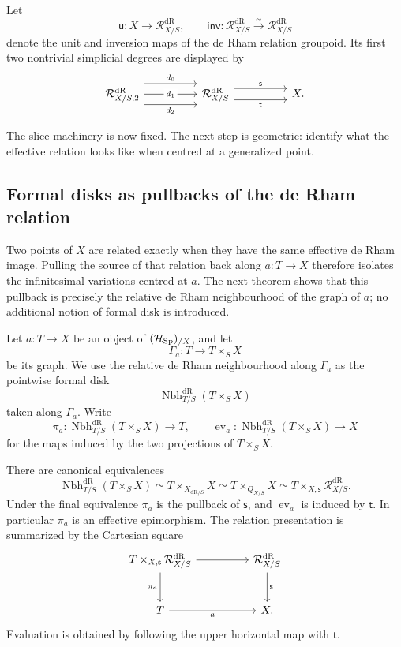 Let
\[
  \mathsf u:X\to\mathcal R^{\mathrm{dR}}_{X/S},
  \qquad
  \mathsf{inv}:
  \mathcal R^{\mathrm{dR}}_{X/S}
  \xrightarrow{\simeq}
  \mathcal R^{\mathrm{dR}}_{X/S}
\]
denote the unit and inversion maps of the de Rham relation groupoid. Its
first two nontrivial simplicial degrees are displayed by
\[
\begin{tikzcd}[column sep=huge]
\mathcal R^{\mathrm{dR}}_{X/S,2}
  \ar[r,shift left=2.2ex,"d_0"]
  \ar[r,"d_1" description]
  \ar[r,shift right=2.2ex,"d_2"']
&
\mathcal R^{\mathrm{dR}}_{X/S}
  \ar[r,shift left=1.2ex,"\mathsf s"]
  \ar[r,shift right=1.2ex,"\mathsf t"']
&
X .
\end{tikzcd}
\]

The slice machinery is now fixed. The next step is geometric: identify what the
effective relation looks like when centred at a generalized point.

\subsection{Formal disks as pullbacks of the de Rham relation}
\label{sec:formal-disks}

Two points of \(X\) are related exactly when they have the same effective de
Rham image. Pulling the source of that relation back along
\(a:T\to X\) therefore isolates the infinitesimal variations centred at
\(a\). The next theorem shows that this pullback is precisely the relative de
Rham neighbourhood of the graph of \(a\); no additional notion of formal disk
is introduced.

Let \(a:T\to X\) be an object of \((\mathcal H_{\operatorname{Sp}})_{/X}\), and let
\[
  \Gamma_a:T\longrightarrow T\times_SX
\]
be its graph. We use the relative de Rham neighbourhood along \(\Gamma_a\) as
the pointwise formal disk
\[
  \operatorname{Nbh}^{\mathrm{dR}}_{T/S}(T\times_SX)
\]
taken along \(\Gamma_a\). Write
\[
  \pi_a:
  \operatorname{Nbh}^{\mathrm{dR}}_{T/S}(T\times_SX)\to T,
  \qquad
  \operatorname{ev}_a:
  \operatorname{Nbh}^{\mathrm{dR}}_{T/S}(T\times_SX)\to X
\]
for the maps induced by the two projections of \(T\times_SX\).

\begin{theorem}
\label{thm:formal-disk-graph-neighbourhood}
\label{prop:disk-effective-quotient}
There are canonical equivalences
\[
  \operatorname{Nbh}^{\mathrm{dR}}_{T/S}(T\times_SX)
  \simeq
  T\times_{X_{\mathrm{dR}/S}}X
  \simeq
  T\times_{Q_{X/S}}X
  \simeq
  T\times_{X,\mathsf s}\mathcal R^{\mathrm{dR}}_{X/S}.
\]
Under the final equivalence \(\pi_a\) is the pullback of \(\mathsf s\), and
\(\operatorname{ev}_a\) is induced by \(\mathsf t\). In particular \(\pi_a\)
is an effective epimorphism.
The relation presentation is summarized by the Cartesian square
\[
\begin{tikzcd}[column sep=huge,row sep=large]
T\times_{X,\mathsf s}\mathcal R^{\mathrm{dR}}_{X/S}
  \ar[r]
  \ar[d,"\pi_a"']
&
\mathcal R^{\mathrm{dR}}_{X/S}
  \ar[d,"\mathsf s"]\\
T \ar[r,"a"']
&
X .
\end{tikzcd}
\]
Evaluation is obtained by following the upper horizontal map with \(\mathsf t\).
\end{theorem}

